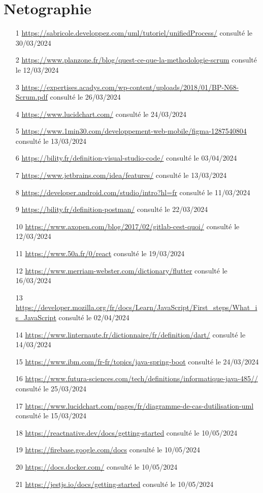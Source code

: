 \chapter*{Netographie}
\adjustmtc
\begin{sloppypar} 
\thispagestyle{MyStyle}
\small %


\begin{enumerate}
\item [1] \url{https://sabricole.developpez.com/uml/tutoriel/unifiedProcess/} consulté le 30/03/2024
\item [2] \url{https://www.planzone.fr/blog/quest-ce-que-la-methodologie-scrum} consulté le 12/03/2024
\item [3] \url{https://expertises.acadys.com/wp-content/uploads/2018/01/BP-N68-Scrum.pdf} consulté le 26/03/2024
\item [4] \url{https://www.lucidchart.com/} consulté le 24/03/2024
\item [5] \url{https://www.1min30.com/developpement-web-mobile/figma-1287540804} consulté le 13/03/2024
\item [6] \url{https://bility.fr/definition-visual-studio-code/} consulté le 03/04/2024
\item [7] \url{https://www.jetbrains.com/idea/features/} consulté le 13/03/2024
\item [8] \url{https://developer.android.com/studio/intro?hl=fr} consulté le 11/03/2024
\item [9] \url{https://bility.fr/definition-postman/} consulté le 22/03/2024
\item [10] \url{https://www.axopen.com/blog/2017/02/gitlab-cest-quoi/} consulté le 12/03/2024
\item [11] \url{https://www.50a.fr/0/react} consulté le 19/03/2024
\item [12] \url{https://www.merriam-webster.com/dictionary/flutter} consulté le 16/03/2024
\item [13] \url{https://developer.mozilla.org/fr/docs/Learn/JavaScript/First_steps/What_is_JavaScript} consulté le 02/04/2024
\item [14] \url{https://www.linternaute.fr/dictionnaire/fr/definition/dart/} consulté le 14/03/2024
\item [15] \url{https://www.ibm.com/fr-fr/topics/java-spring-boot} consulté le 24/03/2024
\item [16] \url{https://www.futura-sciences.com/tech/definitions/informatique-java-485//} consulté le 25/03/2024
\item [17] \url{https://www.lucidchart.com/pages/fr/diagramme-de-cas-dutilisation-uml} consulté le 15/03/2024
\item [18] \url{https://reactnative.dev/docs/getting-started} consulté le 10/05/2024
\item [19] \url{https://firebase.google.com/docs} consulté le 10/05/2024
\item [20] \url{https://docs.docker.com/} consulté le 10/05/2024
\item [21] \url{https://jestjs.io/docs/getting-started} consulté le 10/05/2024
\end{enumerate}
\end{sloppypar}

